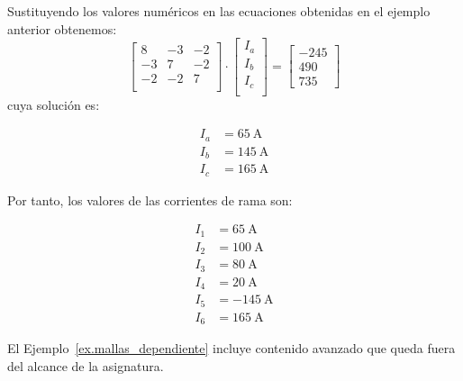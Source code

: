 \begin{example}
          Sustituyendo los valores numéricos en las ecuaciones
          obtenidas en el ejemplo anterior obtenemos:
          \[
            \left[\begin{array}{ccc}
                    8 & -3 & -2 \\
                    -3 & 7 & -2 \\
                    -2 & -2 & 7\\
                  \end{array}\right]%
                \cdot \left[\begin{array}{c}
                              I_a\\
                              I_b\\
                              I_c\\
                            \end{array}\right]%
                          = \left[\begin{array}{c}
                                    -245\\
                                    490\\
                                    735
                                  \end{array}\right]
                              \]
                              cuya solución es:

\begin{align*}
  I_a &= \SI{65}{\ampere}\\
  I_b &= \SI{145}{\ampere}\\
  I_c &= \SI{165}{\ampere}
\end{align*}

Por tanto, los valores de las corrientes de rama son:

\begin{align*}
  I_1 &= \SI{65}{\ampere}\\
  I_2 &= \SI{100}{\ampere}\\
  I_3 &= \SI{80}{\ampere}\\
  I_4 &= \SI{20}{\ampere}\\
  I_5 &= \SI{-145}{\ampere}\\
  I_6 &= \SI{165}{\ampere}
\end{align*}
\end{example}
	
	\begin{remark}
	    El Ejemplo~\ref{ex.mallas_dependiente} incluye contenido avanzado que queda fuera del alcance de la asignatura.
	\end{remark}
	
